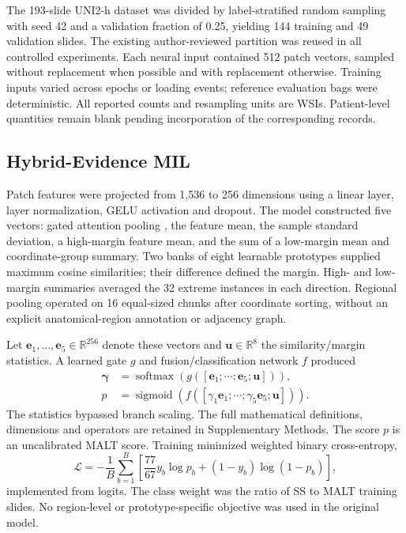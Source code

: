 The 193-slide UNI2-h dataset was divided by label-stratified random sampling with seed 42 and a validation fraction of 0.25, yielding 144 training and 49 validation slides. The existing author-reviewed partition was reused in all controlled experiments. Each neural input contained 512 patch vectors, sampled without replacement when possible and with replacement otherwise. Training inputs varied across epochs or loading events; reference evaluation bags were deterministic. All reported counts and resampling units are WSIs. Patient-level quantities remain blank pending incorporation of the corresponding records.

\subsection{Hybrid-Evidence MIL}
Patch features were projected from 1,536 to 256 dimensions using a linear layer, layer normalization, GELU activation and dropout. The model constructed five vectors: gated attention pooling \citep{ref5}, the feature mean, the sample standard deviation, a high-margin feature mean, and the sum of a low-margin mean and coordinate-group summary. Two banks of eight learnable prototypes supplied maximum cosine similarities; their difference defined the margin. High- and low-margin summaries averaged the 32 extreme instances in each direction. Regional pooling operated on 16 equal-sized chunks after coordinate sorting, without an explicit anatomical-region annotation or adjacency graph.

Let $\mathbf{e}_1,\ldots,\mathbf{e}_5\in\mathbb{R}^{256}$ denote these vectors and $\mathbf{u}\in\mathbb{R}^{8}$ the similarity/margin statistics. A learned gate $g$ and fusion/classification network $f$ produced
\begin{align}
\boldsymbol\gamma&=\operatorname{softmax}\!\left(g([\mathbf{e}_1;\cdots;\mathbf{e}_5;\mathbf{u}])\right),\label{eq:main-gate}\\
p&=\operatorname{sigmoid}\!\left(f([\gamma_1\mathbf{e}_1;\cdots;\gamma_5\mathbf{e}_5;\mathbf{u}])\right).\label{eq:main-score}
\end{align}
The statistics bypassed branch scaling. The full mathematical definitions, dimensions and operators are retained in Supplementary Methods. The score $p$ is an uncalibrated MALT score. Training minimized weighted binary cross-entropy,
\begin{equation}
\mathcal L=-\frac{1}{B}\sum_{b=1}^{B}\left[\frac{77}{67}y_b\log p_b+(1-y_b)\log(1-p_b)\right],
\end{equation}
implemented from logits. The class weight was the ratio of SS to MALT training slides. No region-level or prototype-specific objective was used in the original model.

